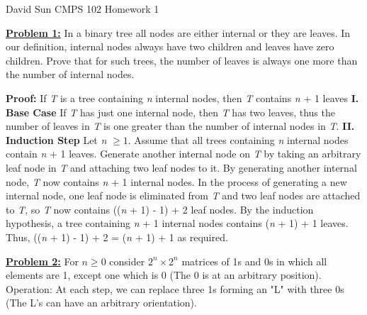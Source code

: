 \documentclass[11pt]{article}
\begin{document}
	\begin{flushleft}
		David Sun\newline
		CMPS 102\newline
		Homework 1\newline

		\item \textbf {\underline{Problem 1:}} 
		In a binary tree all nodes are either internal or they are leaves.  In our definition, internal
		nodes always have two children and leaves have zero children.  Prove that for such trees, the
		number of leaves is always one more than the number of internal nodes.\newline
		
		\textbf{Proof:}\newline
		If \emph{T} is a tree containing \emph{n} internal nodes, then \emph{T} contains \emph{n} + 1 leaves\newline\newline
		\textbf{I. Base Case}\newline
		If \emph{T} has just one internal node, then \emph{T} has two leaves, thus the number of leaves in \emph{T} is one greater than the number of internal nodes in \emph{T}.\newline\newline
		\textbf{II. Induction Step}\newline
		Let \emph{n} $\geq 1$. Assume that all trees containing \emph{n} internal nodes contain \emph{n} + 1 leaves. Generate another internal node on \emph{T} by taking an arbitrary leaf node in \emph{T} and attaching two leaf nodes to it. By generating another internal node, \emph{T} now contains \emph{n} + 1 internal nodes. In the process of generating a new internal node, one leaf node is eliminated from \emph{T} and two leaf nodes are attached to \emph{T}, so \emph{T} now contains ((\emph{n} + 1) - 1) + 2 leaf nodes. By the induction hypothesis, a tree containing \emph{n} + 1 internal nodes contains (\emph{n} + 1) + 1 leaves. \newline Thus, ((\emph{n} + 1) - 1) + 2 = (\emph{n} + 1) + 1 as required. 
		\vspace{.2cm}
		
		\item \textbf {\underline{Problem 2:}}
		For $n\ge0$ consider $2^n \times 2^n$ matrices of 1s and 0s in
		which all elements are 1, except one 
		which is 0 (The 0 is at an arbitrary position). 
		Operation: At each step, we can replace three 1s forming an
		"L" with three 0s (The L's can have an arbitrary orientation).\newline
		

\end{flushleft}
\end{document}
